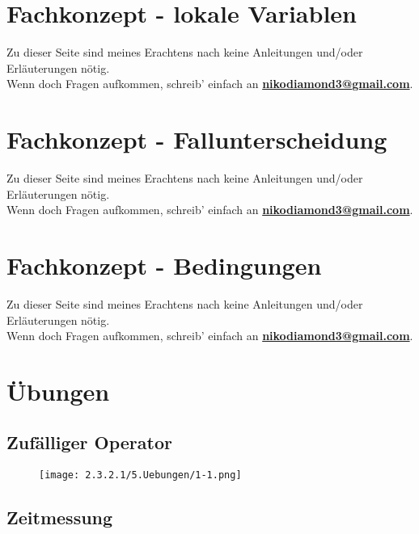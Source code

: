 \documentclass{scrartcl}   %
\begin{document}
\newpage

\section{Fachkonzept - lokale Variablen}

Zu dieser Seite sind meines Erachtens nach keine Anleitungen und/oder Erläuterungen nötig.\\
Wenn doch Fragen aufkommen, schreib' einfach an \textbf{\href{mailto:nikodiamond3@gmail.com}{nikodiamond3@gmail.com}}.

\newpage

\section{Fachkonzept - Fallunterscheidung}

Zu dieser Seite sind meines Erachtens nach keine Anleitungen und/oder Erläuterungen nötig.\\
Wenn doch Fragen aufkommen, schreib' einfach an \textbf{\href{mailto:nikodiamond3@gmail.com}{nikodiamond3@gmail.com}}.

\newpage

\section{Fachkonzept - Bedingungen}

Zu dieser Seite sind meines Erachtens nach keine Anleitungen und/oder Erläuterungen nötig.\\
Wenn doch Fragen aufkommen, schreib' einfach an \textbf{\href{mailto:nikodiamond3@gmail.com}{nikodiamond3@gmail.com}}.

\newpage

\section{Übungen}

\subsection{Zufälliger Operator}

\begin{figure}[ht]
	\centering
	\texttt{[image: 2.3.2.1/5.Uebungen/1-1.png]}
\end{figure}

\newpage

\subsection{Zeitmessung}
\end{document}
